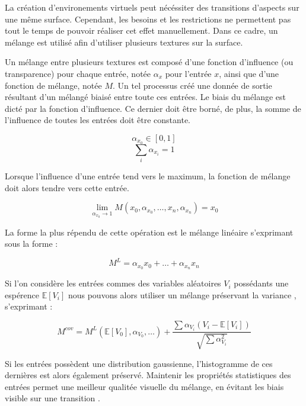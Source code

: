 \documentclass[9pt, twocolumn]{article} %
\begin{document}
La création d'environements virtuels peut nécéssiter des transitions d'aspects
sur une même surface. Cependant, les besoins et les restrictions ne permettent
pas tout le temps de pouvoir réaliser cet effet manuellement. Dans ce cadre, un
mélange est utilisé afin d'utiliser plusieurs textures sur la surface.

Un mélange entre plusieurs textures est composé d'une fonction d'influence (ou
transparence) pour chaque entrée, notée $\alpha_x$ pour l'entrée $x$, ainsi que
d'une fonction de mélange, notée $M$. Un tel processus créé une donnée de
sortie résultant d'un mélangé biaisé entre toute ces entrées. Le biais du
mélange est dicté par la fonction d'influence. Ce dernier doit être borné, de
plus, la somme de l'influence de toutes les entrées doit être constante.

\begin{equation}\label{AlphaBorne}
  \alpha_{x_0} \in [0, 1]
\end{equation}
\begin{equation}\label{AlphaConstant}
  \sum_i \alpha_{x_i} = 1
\end{equation}

Lorsque l'influence d'une entrée tend vers le maximum, la fonction de mélange
doit alors tendre vers cette entrée.

\begin{equation}\label{MixLimit}
  \lim_{\alpha_{x_0} \rightarrow 1} M(x_0, \alpha_{x_0}, \dots , x_n, \alpha_{x_n}) = x_0
\end{equation}

La forme la plus répendu de cette opération est le mélange linéaire s'exprimant
sous la forme :

\begin{equation}\label{MixLinear}
  M^{L} = \alpha_{x_0} x_0 + \dots + \alpha_{x_n} x_n
\end{equation}

Si l'on considère les entrées commes des variables aléatoires $V_i$ possédants
une espérence $ \mathbb{E}[V_i] $ nous pouvons alors utiliser un mélange
préservant la variance \cite{HPnoise}, s'exprimant :

\begin{equation}\label{MixVariancePreserving}
  M^{cov}
  =
  M^{L}(\mathbb{E}[V_0], \alpha_{V_0}, \dots) + \frac {\sum \alpha_{V_i}(V_i
    - \mathbb{E}[V_i])} {\sqrt{\sum \alpha_{V_i}^2}}
\end{equation}

Si les entrées possèdent une distribution gaussienne, l'histogramme de ces
dernières est alors également préservé. Maintenir les propriétés statistiques
des entrées permet une meilleur qualitée visuelle du mélange, en évitant les
biais visible sur une transition \cite{HPnoise}.
\end{document}
